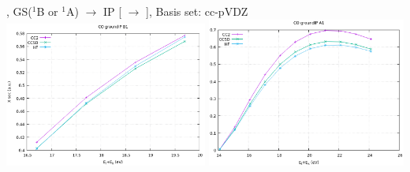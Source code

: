 \vfill
{}, GS($^1$B or $^1$A) $\to$ IP [ $\longrightarrow$ ], Basis set: cc-pVDZ
\includegraphics[width=0.5\textwidth]{chapters/appendix/image/CO1.png}
\includegraphics[width=0.49\textwidth]{chapters/appendix/image/CO2.png}\\
\vfill
